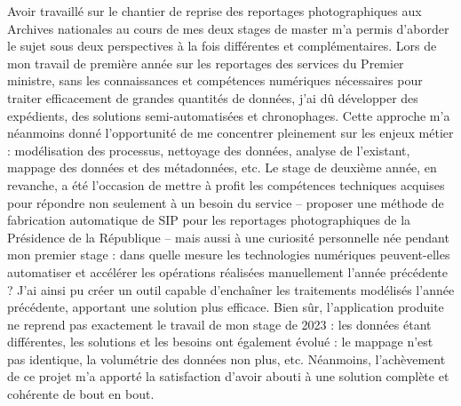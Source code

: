 Avoir travaillé sur le chantier de reprise des reportages photographiques aux Archives nationales au cours de mes deux stages de master m'a permis d'aborder le sujet sous deux perspectives à la fois différentes et complémentaires. Lors de mon travail de première année sur les reportages des services du Premier ministre, sans les connaissances et compétences numériques nécessaires pour traiter efficacement de grandes quantités de données, j'ai dû développer des expédients, des solutions semi-automatisées et chronophages. Cette approche m'a néanmoins donné l'opportunité de me concentrer pleinement sur les enjeux métier : modélisation des processus, nettoyage des données, analyse de l'existant, mappage des données et des métadonnées, etc. Le stage de deuxième année, en revanche, a été l'occasion de mettre à profit les compétences techniques acquises pour répondre non seulement à un besoin du service -- proposer une méthode de fabrication automatique de SIP pour les reportages photographiques de la Présidence de la République -- mais aussi à une curiosité personnelle née pendant mon premier stage : dans quelle mesure les technologies numériques peuvent-elles automatiser et accélérer les opérations réalisées manuellement l'année précédente ? J'ai ainsi pu créer un outil capable d'enchaîner les traitements modélisés l'année précédente, apportant une solution plus efficace. Bien sûr, l'application produite ne reprend pas exactement le travail de mon stage de 2023 : les données étant différentes, les solutions et les besoins ont également évolué : le mappage n'est pas identique, la volumétrie des données non plus, etc. Néanmoins, l'achèvement de ce projet m'a apporté la satisfaction d'avoir abouti à une solution complète et cohérente de bout en bout.